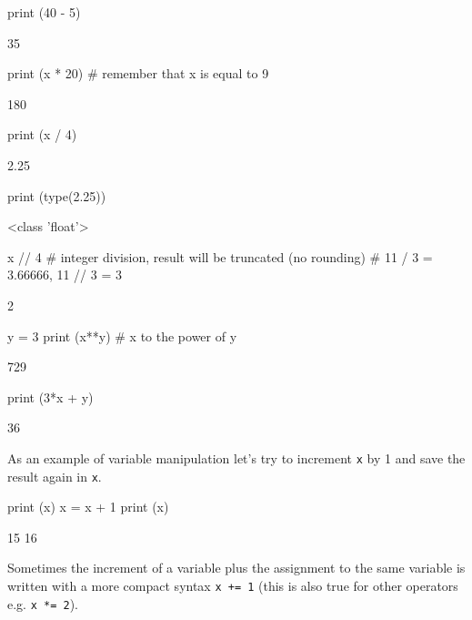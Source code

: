 \begin{ipython}
print (40 - 5)	
\end{ipython}
\begin{ioutput}
35
\end{ioutput}

\begin{ipython}
print (x * 20) # remember that x is equal to 9
\end{ipython}
\begin{ioutput}
180	
\end{ioutput}

\begin{ipython}
print (x / 4)
\end{ipython}
\begin{ioutput}
2.25
\end{ioutput}

\begin{ipython}
print (type(2.25))
\end{ipython}
\begin{ioutput}
<class 'float'>	
\end{ioutput}

\begin{ipython}
x // 4 # integer division, result will be truncated (no rounding)
       # 11 / 3 = 3.66666, 11 // 3 = 3
\end{ipython}
\begin{ioutput}
2
\end{ioutput}

\begin{ipython}
y = 3
print (x**y) # x to the power of y 	
\end{ipython}
\begin{ioutput}
729
\end{ioutput}

\begin{ipython}
print (3*x + y)	
\end{ipython}
\begin{ioutput}
36	
\end{ioutput}

As an example of variable manipulation let's try to increment \texttt{x} by 1 and save the result again in \texttt{x}.

\begin{ipython}
print (x)
x = x + 1
print (x)	
\end{ipython}
\begin{ioutput}
15
16
\end{ioutput}

Sometimes the increment of a variable plus the assignment to the same variable is written with a more compact syntax \texttt{x += 1} (this is also true for other operators e.g. \texttt{x *= 2}).

